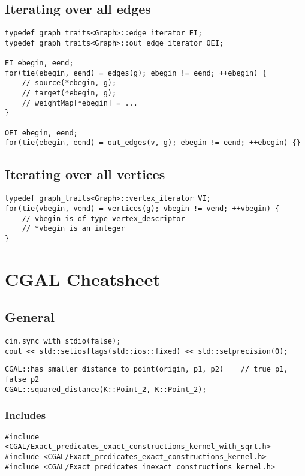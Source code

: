 \documentclass[11pt]{article}
\let\stdsection\section
\renewcommand\section{\newpage\stdsection}
\begin{document}
\subsection{Iterating over all edges}
\begin{lstlisting}
typedef graph_traits<Graph>::edge_iterator EI;
typedef graph_traits<Graph>::out_edge_iterator OEI;

EI ebegin, eend;
for(tie(ebegin, eend) = edges(g); ebegin != eend; ++ebegin) {
    // source(*ebegin, g);
    // target(*ebegin, g);
    // weightMap[*ebegin] = ...
}

OEI ebegin, eend;
for(tie(ebegin, eend) = out_edges(v, g); ebegin != eend; ++ebegin) {}
\end{lstlisting}

\subsection{Iterating over all vertices}
\begin{lstlisting}
typedef graph_traits<Graph>::vertex_iterator VI;
for(tie(vbegin, vend) = vertices(g); vbegin != vend; ++vbegin) {
    // vbegin is of type vertex_descriptor
    // *vbegin is an integer
}
\end{lstlisting}





\section{CGAL Cheatsheet}

\subsection{General}
\begin{lstlisting}
cin.sync_with_stdio(false);
cout << std::setiosflags(std::ios::fixed) << std::setprecision(0);
\end{lstlisting}

\begin{lstlisting}
CGAL::has_smaller_distance_to_point(origin, p1, p2)    // true p1, false p2 
CGAL::squared_distance(K::Point_2, K::Point_2);
\end{lstlisting}

\subsubsection{Includes}
\begin{lstlisting}
#include <CGAL/Exact_predicates_exact_constructions_kernel_with_sqrt.h>
#include <CGAL/Exact_predicates_exact_constructions_kernel.h>
#include <CGAL/Exact_predicates_inexact_constructions_kernel.h>
\end{lstlisting}
\end{document}
